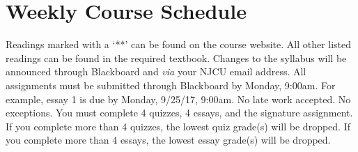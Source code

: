 \documentclass[article,oneside]{memoir}
\begin{document}
\section{Weekly Course Schedule}
Readings marked with a `**' can be found on the course website. All other listed readings can be found in the required textbook. Changes to the syllabus will be announced through Blackboard and \emph{via} your NJCU email address.  All assignments must be submitted through Blackboard by Monday, 9:00am. For example, essay 1 is due by Monday, 9/25/17, 9:00am. No late work accepted. No exceptions. You must complete 4 quizzes, 4 essays, and the signature assignment.  If you complete more than 4 quizzes, the lowest quiz grade(s) will be dropped. If you complete more than 4 essays, the lowest essay grade(s) will be dropped.   \newline
\end{document}
